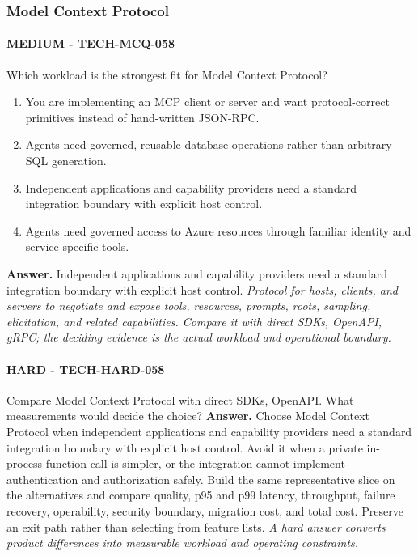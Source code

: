 \subsubsection*{Model Context Protocol}
\paragraph{MEDIUM - TECH-MCQ-058} Which workload is the strongest fit for Model Context Protocol?
\begin{enumerate}[label=\Alph*.]
\item You are implementing an MCP client or server and want protocol-correct primitives instead of hand-written JSON-RPC.
\item Agents need governed, reusable database operations rather than arbitrary SQL generation.
\item Independent applications and capability providers need a standard integration boundary with explicit host control.
\item Agents need governed access to Azure resources through familiar identity and service-specific tools.
\end{enumerate}
\textbf{Answer.} Independent applications and capability providers need a standard integration boundary with explicit host control.
\textit{Protocol for hosts, clients, and servers to negotiate and expose tools, resources, prompts, roots, sampling, elicitation, and related capabilities. Compare it with direct SDKs, OpenAPI, gRPC; the deciding evidence is the actual workload and operational boundary.}
\paragraph{HARD - TECH-HARD-058} Compare Model Context Protocol with direct SDKs, OpenAPI. What measurements would decide the choice?
\textbf{Answer.} Choose Model Context Protocol when independent applications and capability providers need a standard integration boundary with explicit host control. Avoid it when a private in-process function call is simpler, or the integration cannot implement authentication and authorization safely. Build the same representative slice on the alternatives and compare quality, p95 and p99 latency, throughput, failure recovery, operability, security boundary, migration cost, and total cost. Preserve an exit path rather than selecting from feature lists.
\textit{A hard answer converts product differences into measurable workload and operating constraints.}
